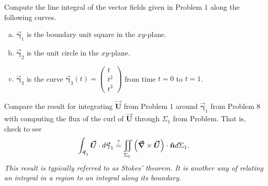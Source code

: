 \documentclass[12pt]{article} %
\newcommand{\curvegamma}{\boldsymbol{\vec{\gamma}}}
\newcommand{\grad}{\boldsymbol{\vec{\nabla}}}
\newcommand{\vecfieldU}{\boldsymbol{\vec{U}}}
\begin{document}
\begin{problem}
Compute the line integral of the vector fields given in Problem 1 along the following curves.
\begin{multicols}{2}
\begin{enumerate}[(a)]
    \item $\curvegamma_1$ is the boundary unit square in the $xy$-plane.  
    \item $\curvegamma_2$ is the unit circle in the $xy$-plane.
    \item $\curvegamma_3$ is the curve $\curvegamma_3(t)=\begin{pmatrix} t \\ t^2 \\ t^3 \end{pmatrix}$ from time $t=0$ to $t=1$.
\end{enumerate}
\end{multicols}
\end{problem}

\begin{problem}
Compare the result for integrating $\vecfieldU$ from Problem 1 around $\curvegamma_1$ from Problem 8 with computing the flux of the curl of $\vecfieldU$ through $\Sigma_1$ from Problem. That is, check to see
\[
\int_{\curvegamma_1} \vecfieldU \cdot d\curvegamma_1 \stackrel{?}{=} \iint_{\Sigma_1} \left(\grad \times \vecfieldU \right)\cdot \unitvec d\Sigma_1.
\]
\emph{This result is typically referred to as Stokes' theorem. It is another way of relating an integral in a region to an integral along its boundary.}
\end{problem}
\end{document}

